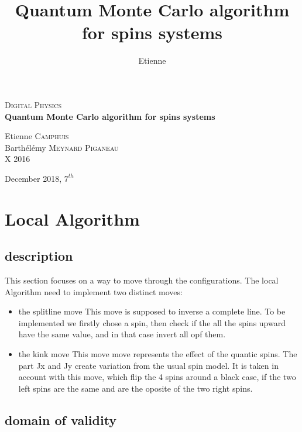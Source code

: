 \documentclass[a4paper,12pt,twoside]{article}
\title{Quantum Monte Carlo algorithm for spins systems}
\author{Etienne \bsc{Camphuis}}
\begin{document}
	\begin{titlepage}
		\begin{center}
			\textsc{\Large Digital Physics}\\[1.5cm]
			
			{ \huge \bfseries Quantum Monte Carlo algorithm for spins systems\\[0.4cm] }
		\vfill
		\begin{minipage}{0.4\textwidth}
			\large
			\centering
			Etienne \textsc{Camphuis}\\
			Barthélémy \textsc{Meynard Piganeau} \\
			X 2016\\
		\end{minipage}
		
		{\large December 2018, $7^{th}$}
		\end{center}
	\end{titlepage}
	
	\section{Local Algorithm}
	\subsection{description}

		
		 This section focuses on a way to move through the configurations.
		 The local Algorithm need to implement two distinct moves:
		 
		 \begin{itemize}
		 	\item{the splitline move} This move is supposed to inverse a complete line. To be implemented we firstly chose a spin, then check if the all the spins upward have the same value, and in that case invert all opf them.
		 	
		 	\item{the kink move} This move move represents the effect of the quantic spins. The part Jx and Jy create variation from the usual spin model. It is taken in account with this move, which flip the 4 spins around a black case, if the two left spins are the same and are the oposite of the two right spins.
		 \end{itemize}
		 	
		 	
		 	
		 	\subsection{domain of validity}
\end{document}
